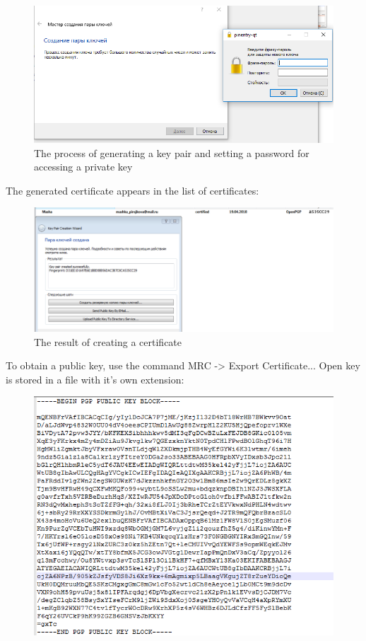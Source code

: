 \documentclass[14pt,a4paper,report]{report}
\begin{document}
\begin{figure}[h!]
	\centering
	\includegraphics[scale = 0.65]{images/1_3.png}
	\caption{The process of generating a key pair and setting a password for accessing a private key}
\end{figure}

The generated certificate appears in the list of certificates:

\begin{figure}[h!]
	\centering
	\includegraphics[scale = 0.7]{images/1_4.png}
	\caption{The result of creating a certificate}
\end{figure}
\newpage
To obtain a public key, use the command MRC -> Export Certificate... Open key is stored in a file with it's own extension:

\begin{figure}[h!]
	\centering
	\includegraphics[scale = 0.65]{images/1_5.png}
	\caption{}
\end{figure}
\newpage
\end{document}
